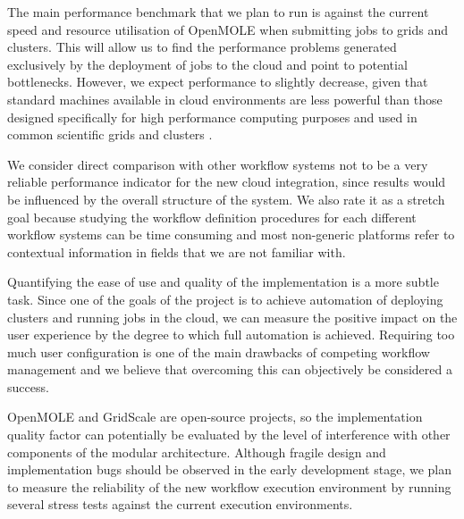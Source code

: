 The main performance benchmark that we plan to run is against the current speed and resource utilisation of OpenMOLE when submitting jobs to grids and clusters. This will allow us to find the performance problems generated exclusively by the deployment of jobs to the cloud and point to potential bottlenecks. However, we expect performance to slightly decrease, given that standard machines available in cloud environments are less powerful than those designed specifically for high performance computing purposes and used in common scientific grids and clusters \cite{Juve2009}.

We consider direct comparison with other workflow systems not to be a very reliable performance indicator for the new cloud integration, since results would be influenced by the overall structure of the system. We also rate it as a stretch goal because studying the workflow definition procedures for each different workflow systems can be time consuming and most non-generic platforms refer to contextual information in fields that we are not familiar with.

Quantifying the ease of use and quality of the implementation is a more subtle task. Since one of the goals of the project is to achieve automation of deploying clusters and running jobs in the cloud, we can measure the positive impact on the user experience by the degree to which full automation is achieved. Requiring too much user configuration is one of the main drawbacks of competing workflow management and we believe that overcoming this can objectively be considered a success.

OpenMOLE and GridScale are open-source projects, so the implementation quality factor can potentially be evaluated by the level of interference with other components of the modular architecture. Although fragile design and implementation bugs should be observed in the early development stage, we plan to measure the reliability of the new workflow execution environment by running several stress tests against the current execution environments.